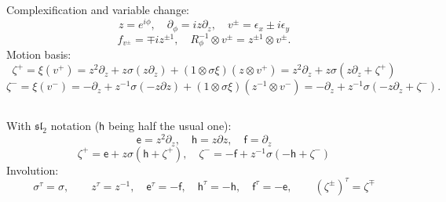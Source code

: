 \documentclass{amsart}
\def\e{\mathsf{e}}
\def\h{\mathsf{h}}
\def\f{\mathsf{f}}
\def\inv{\tau} %
\theoremstyle{definition}
\begin{document}
\subsection{}
Complexification and variable change:
$$ z = e^{i\phi},\quad \partial_\phi = iz\partial_z,\quad v^\pm = \epsilon_x \pm i\epsilon_y $$
$$ f_{v^\pm} = \mp i z^{\pm 1},\quad
R_\phi^{-1} \otimes v^{\pm} = z^{\pm 1} \otimes v^{\pm}.$$
Motion basis:
$$ \zeta^+ = \xi(v^+) = z^2\partial_z + z \sigma (z\partial_z) + (1\otimes \sigma\xi)(z\otimes v^+)
= z^2\partial_z + z\sigma(z\partial_z + \zeta^+) $$
$$ \zeta^- = \xi(v^-) =- \partial_z + z^{-1}\sigma(-z\partial z) + (1\otimes\sigma\xi)(z^{-1}\otimes v^-)
= -\partial_z + z^{-1}\sigma(-z\partial_z + \zeta^-). $$
\subsection{}
With $\mathfrak{sl}_2$ notation ($\h$ being half the usual one):
$$ \e = z^2\partial_z,\quad \h = z\partial z,\quad \f = \partial_z $$
$$\zeta^+ = \e + z\sigma(\h + \zeta^+),\quad \zeta^- = -\f + z^{-1}\sigma(-\h + \zeta^-)$$
Involution:
$$ \sigma^\inv=\sigma,\qquad z^\inv = z^{-1},\quad \e^\inv=-\f,\quad \h^\inv=-\h,\quad \f^\inv=-\e,
\qquad
\left(\zeta^{\pm}\right)^\inv=\zeta^\mp $$
\end{document}
